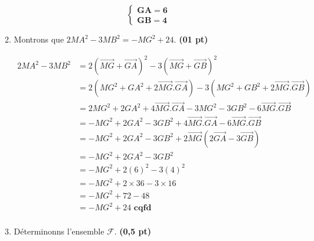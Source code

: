 \documentclass[12pt,a4paper]{article}
\begin{document}
\begin{enumerate}
\begin{enumerate}
                    \begin{resultbox}
                        \[
                            \mathbf{ \begin{cases}
                                    GA = 6 \\
                                    GB = 4
                                \end{cases}}
                        \]
                    \end{resultbox}

              \item Montrons que \( 2MA^2 - 3MB^2 = -MG^2 + 24 \). \hfill \textbf{(01 pt)}

                    \(
                    \begin{aligned}
                        2MA^2 - 3MB^2 & = 2(\overrightarrow{MG}+\overrightarrow{GA})^2 - 3(\overrightarrow{MG}+\overrightarrow{GB})^2                          \\
                                      & =2(MG^{2}+GA^{2}+2\overrightarrow{MG}.\overrightarrow{GA}) - 3(MG^{2}+GB^{2}+2\overrightarrow{MG}.\overrightarrow{GB}) \\
                                      & =2MG^{2}+2GA^{2}+4\overrightarrow{MG}.\overrightarrow{GA} - 3MG^{2}-3GB^{2}-6\overrightarrow{MG}.\overrightarrow{GB}   \\
                                      & =-MG^{2}+2GA^{2} -3GB^{2}+4\overrightarrow{MG}.\overrightarrow{GA}-6\overrightarrow{MG}.\overrightarrow{GB}            \\
                                      & =-MG^{2}+2GA^{2} -3GB^{2}+2\overrightarrow{MG}(2\overrightarrow{GA}-3\overrightarrow{GB})                              \\
                                      & =-MG^{2}+2GA^{2} -3GB^{2}                                                                                              \\
                                      & =-MG^{2}+2(6)^{2} -3(4)^{2}                                                                                            \\
                                      & =-MG^{2}+2\times36 -3\times16                                                                                          \\
                                      & =-MG^{2}+72 -48                                                                                                        \\
                                      & =-MG^{2}+24 \textbf{ cqfd}                                                                                             \\
                    \end{aligned}
                    \)
              \item Déterminonns l’ensemble \( \mathcal{F} \). \hfill \textbf{(0,5 pt)}


\end{enumerate}
\end{enumerate}
\end{document}
